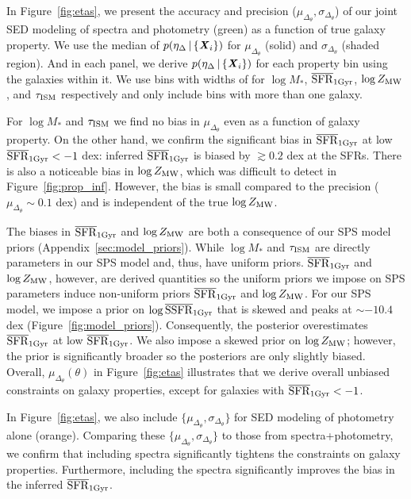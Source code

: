 In Figure~\ref{fig:etas}, we present the accuracy and precision
($\mu_{\Delta_{\theta}}, \sigma_{\Delta_{\theta}}$) of our joint
SED modeling of spectra and photometry (green) as a function of true galaxy
property. 
We use the median of $p(\eta_\Delta \,|\, \{{\textbf{\textit{X}}_i}\})$ for
$\mu_{\Delta_{\theta}}$ (solid) and $\sigma_{\Delta_{\theta}}$ (shaded region).
And in each panel, we derive $p(\eta_\Delta \,|\, \{{\textbf{\textit{X}}_i}\})$ for each
property bin using the galaxies within it.
We use bins with widths of  for $\log
M_*$, $\overline{\rm SFR}_{\rm 1Gyr}$, $\log Z_{\rm MW}$, and $\tau_{\rm ISM}$ respectively and only
include bins with more than one galaxy. 

For $\log M_*$ and $\tau_{\rm ISM}$ we find no bias in $\mu_{\Delta_{\theta}}$
even as a function of galaxy property. 
On the other hand, we confirm the significant bias in $\overline{\rm SFR}_{\rm 1Gyr}$ at low $\overline{\rm SFR}_{\rm 1Gyr}
< -1$ dex: inferred $\overline{\rm SFR}_{\rm 1Gyr}$ is biased by $\gtrsim 0.2$ dex at the SFRs. 
There is also a noticeable bias in $\log Z_{\rm MW}$, which was difficult to
detect in Figure~\ref{fig:prop_inf}. 
However, the bias is small compared to the precision ($\mu_{\Delta_{\theta}}
\sim 0.1$ dex) and is independent of the true $\log Z_{\rm MW}$. 

The biases in $\overline{\rm SFR}_{\rm 1Gyr}$ and $\log Z_{\rm MW}$ are both a consequence of our SPS
model priors (Appendix~\ref{sec:model_priors}). 
While $\log M_*$ and $\tau_{\rm ISM}$ are directly parameters in our SPS model
and, thus, have uniform priors.
$\overline{\rm SFR}_{\rm 1Gyr}$ and $\log Z_{\rm MW}$, however, are derived quantities so the uniform
priors we impose on SPS parameters induce non-uniform priors $\overline{\rm SFR}_{\rm 1Gyr}$ and
$\log Z_{\rm MW}$.
For our SPS model, we impose a prior on $\log \overline{\rm SSFR}_{\rm 1 Gyr}$
that is skewed and peaks at ${\sim}-10.4$ dex (Figure~\ref{fig:model_priors}). 
Consequently, the posterior overestimates $\overline{\rm SFR}_{\rm 1Gyr}$ at low $\overline{\rm SFR}_{\rm 1Gyr}$.
We also impose a skewed prior on $\log Z_{\rm MW}$; however, the prior is
significantly broader so the posteriors are only slightly biased. 
Overall, $\mu_{\Delta_{\theta}}(\theta)$ in Figure~\ref{fig:etas} illustrates
that we derive overall unbiased constraints on galaxy properties, except for
galaxies with $\overline{\rm SFR}_{\rm 1Gyr} < -1$.

In Figure~\ref{fig:etas}, we also include $\{\mu_{\Delta_{\theta}},
\sigma_{\Delta_{\theta}}\}$ for SED modeling of photometry alone (orange). 
Comparing these $\{\mu_{\Delta_{\theta}}, \sigma_{\Delta_{\theta}}\}$ to those
from spectra+photometry, we confirm that including spectra significantly
tightens the constraints on galaxy properties. 
Furthermore, including the spectra significantly improves the bias in the
inferred $\overline{\rm SFR}_{\rm 1Gyr}$. 

